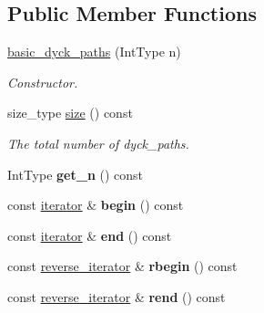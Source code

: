 \subsection*{Public Member Functions}
\begin{DoxyCompactItemize}
\item 
\hyperlink{classdscr_1_1basic__dyck__paths_a378aa930a51fc478f4d638dbc33bc74b}{basic\-\_\-dyck\-\_\-paths} (Int\-Type n)
\begin{DoxyCompactList}\small\item\em Constructor. \end{DoxyCompactList}\item 
size\-\_\-type \hyperlink{classdscr_1_1basic__dyck__paths_ac812c41dbc1a474cfa6916a8d5385791}{size} () const 
\begin{DoxyCompactList}\small\item\em The total number of dyck\-\_\-paths. \end{DoxyCompactList}\item 
\hypertarget{classdscr_1_1basic__dyck__paths_a1d5b92a70a66f7ba36de79ce43020a5d}{Int\-Type {\bfseries get\-\_\-n} () const }\label{classdscr_1_1basic__dyck__paths_a1d5b92a70a66f7ba36de79ce43020a5d}

\item 
\hypertarget{classdscr_1_1basic__dyck__paths_a4821d1acc2381c1d18aacd9324807b93}{const \hyperlink{classdscr_1_1basic__dyck__paths_1_1iterator}{iterator} \& {\bfseries begin} () const }\label{classdscr_1_1basic__dyck__paths_a4821d1acc2381c1d18aacd9324807b93}

\item 
\hypertarget{classdscr_1_1basic__dyck__paths_ab49cc4d36a9e2be3c6341553c8e38639}{const \hyperlink{classdscr_1_1basic__dyck__paths_1_1iterator}{iterator} \& {\bfseries end} () const }\label{classdscr_1_1basic__dyck__paths_ab49cc4d36a9e2be3c6341553c8e38639}

\item 
\hypertarget{classdscr_1_1basic__dyck__paths_a141994390082c25c36c083b6caedbced}{const \hyperlink{classdscr_1_1basic__dyck__paths_1_1reverse__iterator}{reverse\-\_\-iterator} \& {\bfseries rbegin} () const }\label{classdscr_1_1basic__dyck__paths_a141994390082c25c36c083b6caedbced}

\item 
\hypertarget{classdscr_1_1basic__dyck__paths_ac9dd3c2b69ea42ced855705e8aec9190}{const \hyperlink{classdscr_1_1basic__dyck__paths_1_1reverse__iterator}{reverse\-\_\-iterator} \& {\bfseries rend} () const }\label{classdscr_1_1basic__dyck__paths_ac9dd3c2b69ea42ced855705e8aec9190}

\end{DoxyCompactItemize}
